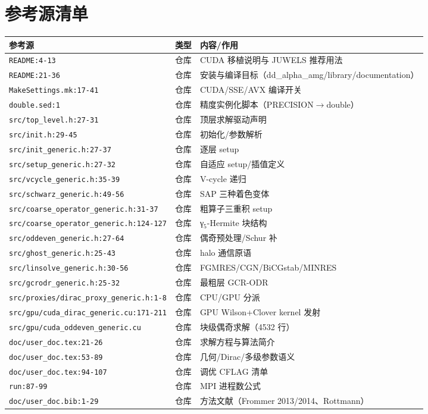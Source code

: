 \documentclass[UTF8]{ctexart}
\begin{document}
\section{参考源清单}
\begin{xltabular}{\textwidth}{llX}
\toprule
\textcolor{evidence}{参考源} & 类型 & 内容/作用 \\
\midrule
\endhead
\texttt{\nolinkurl{README:4-13}} & 仓库 & CUDA 移植说明与 JUWELS 推荐用法 \\
\texttt{\nolinkurl{README:21-36}} & 仓库 & 安装与编译目标（dd\_alpha\_amg/library/documentation）\\
\texttt{\nolinkurl{MakeSettings.mk:17-41}} & 仓库 & CUDA/SSE/AVX 编译开关 \\
\texttt{\nolinkurl{double.sed:1}} & 仓库 & 精度实例化脚本（PRECISION$\rightarrow$double）\\
\texttt{\nolinkurl{src/top_level.h:27-31}} & 仓库 & 顶层求解驱动声明 \\
\texttt{\nolinkurl{src/init.h:29-45}} & 仓库 & 初始化/参数解析 \\
\texttt{\nolinkurl{src/init_generic.h:27-37}} & 仓库 & 逐层 setup \\
\texttt{\nolinkurl{src/setup_generic.h:27-32}} & 仓库 & 自适应 setup/插值定义 \\
\texttt{\nolinkurl{src/vcycle_generic.h:35-39}} & 仓库 & V-cycle 递归 \\
\texttt{\nolinkurl{src/schwarz_generic.h:49-56}} & 仓库 & SAP 三种着色变体 \\
\texttt{\nolinkurl{src/coarse_operator_generic.h:31-37}} & 仓库 & 粗算子三重积 setup \\
\texttt{\nolinkurl{src/coarse_operator_generic.h:124-127}} & 仓库 & γ$_5$-Hermite 块结构 \\
\texttt{\nolinkurl{src/oddeven_generic.h:27-64}} & 仓库 & 偶奇预处理/Schur 补 \\
\texttt{\nolinkurl{src/ghost_generic.h:25-43}} & 仓库 & halo 通信原语 \\
\texttt{\nolinkurl{src/linsolve_generic.h:30-56}} & 仓库 & FGMRES/CGN/BiCGstab/MINRES \\
\texttt{\nolinkurl{src/gcrodr_generic.h:25-32}} & 仓库 & 最粗层 GCR-ODR \\
\texttt{\nolinkurl{src/proxies/dirac_proxy_generic.h:1-8}} & 仓库 & CPU/GPU 分派 \\
\texttt{\nolinkurl{src/gpu/cuda_dirac_generic.cu:171-211}} & 仓库 & GPU Wilson+Clover kernel 发射 \\
\texttt{\nolinkurl{src/gpu/cuda_oddeven_generic.cu}} & 仓库 & 块级偶奇求解（4532 行）\\
\texttt{\nolinkurl{doc/user_doc.tex:21-26}} & 仓库 & 求解方程与算法简介 \\
\texttt{\nolinkurl{doc/user_doc.tex:53-89}} & 仓库 & 几何/Dirac/多级参数语义 \\
\texttt{\nolinkurl{doc/user_doc.tex:94-107}} & 仓库 & 调优 CFLAG 清单 \\
\texttt{\nolinkurl{run:87-99}} & 仓库 & MPI 进程数公式 \\
\texttt{\nolinkurl{doc/user_doc.bib:1-29}} & 仓库 & 方法文献（Frommer 2013/2014、Rottmann）\\
\bottomrule
\end{xltabular}
\end{document}
